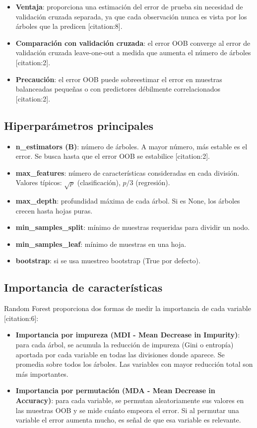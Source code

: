 \documentclass[12pt,a4paper,openany,oneside]{book}
\begin{document}
\begin{itemize}
    \item \textbf{Ventaja}: proporciona una estimación del error de prueba sin necesidad de validación cruzada separada, ya que cada observación nunca es vista por los árboles que la predicen [citation:8].
    \item \textbf{Comparación con validación cruzada}: el error OOB converge al error de validación cruzada leave-one-out a medida que aumenta el número de árboles [citation:2].
    \item \textbf{Precaución}: el error OOB puede sobreestimar el error en muestras balanceadas pequeñas o con predictores débilmente correlacionados [citation:2].
\end{itemize}

\subsection{Hiperparámetros principales}
\begin{itemize}
    \item \textbf{n\_estimators (B)}: número de árboles. A mayor número, más estable es el error. Se busca hasta que el error OOB se estabilice [citation:2].
    \item \textbf{max\_features}: número de características consideradas en cada división. Valores típicos: \(\sqrt{p}\) (clasificación), \(p/3\) (regresión).
    \item \textbf{max\_depth}: profundidad máxima de cada árbol. Si es None, los árboles crecen hasta hojas puras.
    \item \textbf{min\_samples\_split}: mínimo de muestras requeridas para dividir un nodo.
    \item \textbf{min\_samples\_leaf}: mínimo de muestras en una hoja.
    \item \textbf{bootstrap}: si se usa muestreo bootstrap (True por defecto).
\end{itemize}

\subsection{Importancia de características}
Random Forest proporciona dos formas de medir la importancia de cada variable [citation:6]:
\begin{itemize}
    \item \textbf{Importancia por impureza (MDI - Mean Decrease in Impurity)}: para cada árbol, se acumula la reducción de impureza (Gini o entropía) aportada por cada variable en todas las divisiones donde aparece. Se promedia sobre todos los árboles. Las variables con mayor reducción total son más importantes.
    \item \textbf{Importancia por permutación (MDA - Mean Decrease in Accuracy)}: para cada variable, se permutan aleatoriamente sus valores en las muestras OOB y se mide cuánto empeora el error. Si al permutar una variable el error aumenta mucho, es señal de que esa variable es relevante.
\end{itemize}
\end{document}
